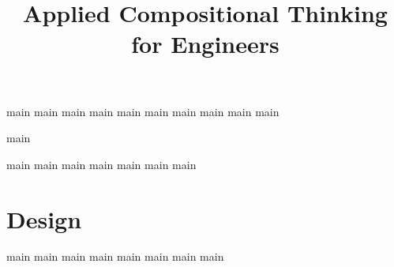 

\pagestyle{scrheadings}

\ohead{\pagemark}
\ihead{\headmark}
\cfoot{}
\dominitoc
\doparttoc
\setcounter{parttocdepth}{0}
\setcounter{minitocdepth}{1}

\title{Applied Compositional Thinking\\ for Engineers}
\date{}



\setcounter{tocdepth}{1}



\tableofcontents


{main}
{main}
{main}
{main}
{main}
{main}
{main}
{main}
{main}
{main}

{main}

{main}
{main}
{main}
{main}
{main}
{main}
{main}


\part{Design}\label{part:co-design}

{main}
{main}
{main}
{main}
{main}
{main}
{main}
{main}


